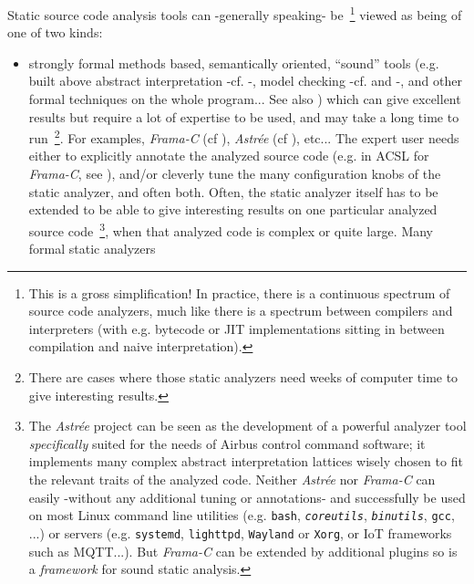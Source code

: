 Static source code analysis tools can -generally speaking-
be~\footnote{This is a gross simplification! In practice, there is a
  continuous spectrum of source code analyzers, much like there is a
  spectrum between compilers and interpreters (with e.g. bytecode or
  JIT implementations sitting in between compilation and naive
  interpretation).} viewed as being of one of two kinds:

\begin{itemize}
  \item strongly formal methods based, semantically oriented,
    ``sound'' tools (e.g. built above abstract interpretation -cf.
    \cite{Cousot:2014:AIP,CousotCousot77-1}-, model checking -cf.
    \cite{Schlich:2010:MCS, Siddiqui:2018:adv-soft-model-check} and \cite{Jhala:2009:SMC}-, and other
    formal techniques on the whole program... See also
    \cite{Andreasen:2017:SAI}) which can give excellent results but
    require a lot of expertise to be used, and may take a long time to
    run~\footnote{There are cases where those static analyzers need
      weeks of computer time to give interesting results.}. For
    examples, \emph{Frama-C} (cf \cite{Cuoq:2012:Frama-C}),
    \emph{Astrée} (cf \cite{Mine:2015:TIU}), etc... The expert user
    needs either to explicitly annotate the analyzed source code
    (e.g. in ACSL for \emph{Frama-C}, see \cite{Baudin:2018:ACSL,
      Delahaye:2013:CSL, Amin:2017:LAW}), and/or cleverly tune the
    many configuration knobs of the static analyzer, and often
    both. Often, the static analyzer itself has to be extended to be
    able to give interesting results on one particular analyzed source
    code~\footnote{The \emph{Astrée} project can be seen as the
      development of a powerful analyzer tool \emph{specifically}
      suited for the needs of Airbus control command software; it
      implements many complex abstract interpretation lattices wisely
      chosen to fit the relevant traits of the analyzed code. Neither
      \emph{Astrée} nor \emph{Frama-C} can easily -without any
      additional tuning or annotations- and successfully be used on
      most Linux command line utilities (e.g. \texttt{bash},
      \texttt{\emph{coreutils}}, \texttt{\emph{binutils}},
      \texttt{gcc}, ...)  or servers (e.g. \texttt{systemd},
      \texttt{lighttpd}, \texttt{Wayland} or \texttt{Xorg}, or IoT
      frameworks such as MQTT...). But \emph{Frama-C} can be extended
      by additional plugins so is a \emph{framework} for sound static
      analysis.}, when that analyzed code is complex or quite
    large. Many formal static analyzers

\end{itemize}
